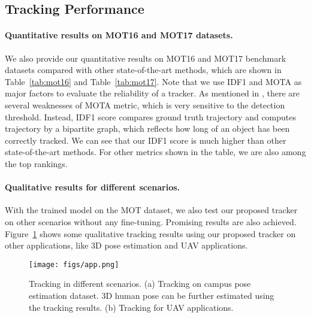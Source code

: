 \documentclass[10pt,twocolumn,letterpaper]{article}
\begin{document}
\subsection{Tracking Performance}


\paragraph{Quantitative results on MOT16 and MOT17 datasets.}

We also provide our quantitative results on MOT16 and MOT17 benchmark datasets compared with other state-of-the-art methods, which are shown in Table~\ref{tab:mot16} and Table~\ref{tab:mot17}. Note that we use IDF1 \cite{ristani2016performance} and MOTA as major factors to evaluate the reliability of a tracker. As mentioned in \cite{ristani2016performance}, there are several weaknesses of MOTA metric, which is very sensitive to the detection threshold. Instead, IDF1 score compares ground truth trajectory and computes trajectory by a bipartite graph, which reflects how long of an object has been correctly tracked. 
We can see that our IDF1 score is much higher than other state-of-the-art methods. For other metrics shown in the table, we are also among the top rankings. 

\paragraph{Qualitative results for different scenarios.}
With the trained model on the MOT dataset, we also test our proposed tracker on other scenarios without any fine-tuning. Promising results are also achieved. Figure~\ref{fig:app_example} shows some qualitative tracking results using our proposed tracker on other applications, like 3D pose estimation and UAV applications. \begin{figure}
\begin{center}
\texttt{[image: figs/app.png]}
\end{center}
   \caption{Tracking in different scenarios. (a) Tracking on campus pose estimation dataset. 3D human pose can be further estimated using the tracking results. (b) Tracking for UAV applications.
   }
\label{fig:app_example} 
\end{figure}
\end{document}
